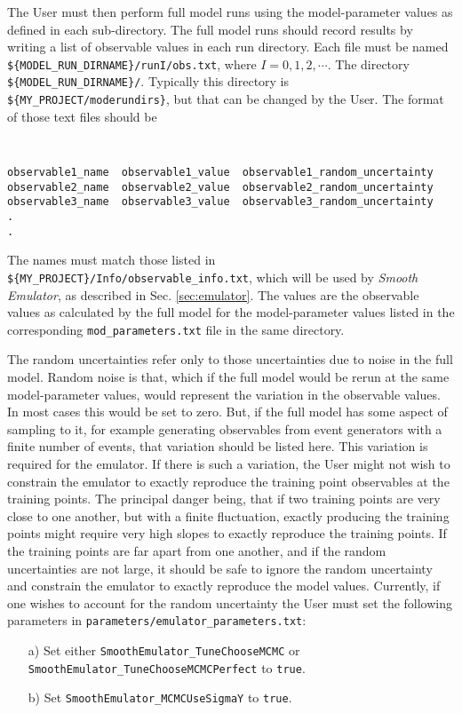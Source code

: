 \documentclass[UserManual.tex]{subfiles}
\begin{document}
The User must then perform full model runs using the model-parameter values as defined in each sub-directory. The full model runs should record results by writing a list of observable values in each run directory. Each file must be named {\tt \$\{MODEL\_RUN\_DIRNAME\}/runI/obs.txt}, where $I=0,1,2,\cdots$. The directory {\tt \$\{MODEL\_RUN\_DIRNAME\}/}. Typically this directory is\\{\tt \$\{MY\_PROJECT/moderundirs\}}, but that can be changed by the User. The format of those text files should be
{\tt
\begin{verbatim}
observable1_name  observable1_value  observable1_random_uncertainty
observable2_name  observable2_value  observable2_random_uncertainty
observable3_name  observable3_value  observable3_random_uncertainty
.
.
\end{verbatim}
}
The names must match those listed in {\tt \$\{MY\_PROJECT\}/Info/observable\_info.txt}, which will be used by {\it Smooth Emulator}, as described in Sec. \ref{sec:emulator}. The values are the observable values as calculated by the full model for the model-parameter values listed in the corresponding {\tt mod\_parameters.txt} file in the same directory.

The random uncertainties refer only to those uncertainties due to noise in the full model. Random noise is that, which if the full model would be rerun at the same model-parameter values, would represent the variation in the observable values. In most cases this would be set to zero. But, if the full model has some aspect of sampling to it, for example generating observables from event generators with a finite number of events, that variation should be listed here. This variation is required for the emulator. If there is such a variation, the User might not wish to constrain the emulator to exactly reproduce the training point observables at the training points. The principal danger being, that if two training points are very close to one another, but with a finite fluctuation, exactly producing the training points might require very high slopes to exactly reproduce the training points. If the training points are far apart from one another, and if the random uncertainties are not large, it should be safe to ignore the random uncertainty and constrain the emulator to exactly reproduce the model values. Currently, if one wishes to account for the random uncertainty the User must set the following parameters in {\tt parameters/emulator\_parameters.txt}:
\begin{itemize}\itemsep=0pt
\item [a)] Set either {\tt SmoothEmulator\_TuneChooseMCMC} or {\tt SmoothEmulator\_TuneChooseMCMCPerfect} to {\tt true}. 
\item [b)] Set {\tt SmoothEmulator\_MCMCUseSigmaY} to {\tt true}.
\end{itemize}
\end{document}
